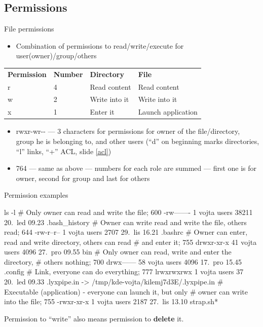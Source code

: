 \documentclass[hyperref={bookmarks=true, unicode=true, colorlinks=true, pdftitle={Linux, command line and MetaCentrum}, plainpages=false, pdfauthor={Vojtech Zeisek}, pdfsubject={Course about use of Linux command line, writing shell scripts and using MetaCentrum of CESNET}, pdfcreator={XeLaTeX, http://www.xelatex.org/}, pdfkeywords={Linux, GNU, BASH, shell, command line, MetaCentrum}, linkcolor=Sienna, anchorcolor=black, citecolor=green, filecolor=magenta, menucolor=Sienna, urlcolor=cyan, pdftex}, compress, ucs, xelatex, xcolor=svgnames, 11pt]{beamer}
\begin{document}
\subsection{Permissions}

\begin{frame}{File permissions}
\begin{itemize}
  \item Combination of permissions to read/write/execute for user(owner)/group/others
\end{itemize}
\begin{center}
\begin{tabular}{llll}
\textbf{Permission} & \textbf{Number} & \textbf{Directory} & \textbf{File}\\
r & 4 & Read content & Read content\\
w & 2 & Write into it & Write into it\\
x & 1 & Enter it & Launch application \\
\end{tabular}
\end{center}
\begin{itemize}
  \item rwxr-wr{-}- --- 3 characters for permissions for owner of the file/directory, group he is belonging to, and other users (``d'' on beginning marks directories, ``l'' links, ``+'' ACL, slide \ref{acl})
  \item 764 --- same as above --- numbers for each role are summed --- first one is for owner, second for group and last for others
\end{itemize}
\end{frame}

\begin{frame}[fragile]{Permission examples}
\begin{bashcode}
    ls -l
    # Only owner can read and write the file; 600
    -rw-------   1 vojta users   38211 20. led 09.23 .bash_history
    # Owner can write read and write the file, others read; 644
    -rw-r--r--   1 vojta users    2707 29. lis 16.21 .bashrc
    # Owner can enter, read and write directory, others can read
    # and enter it; 755
    drwxr-xr-x  41 vojta users    4096 27. pro 09.55 bin
    # Only owner can read, write and enter the directory,
    # others nothing; 700
    drwx------  58 vojta users    4096 17. pro 15.45 .config
    # Link, everyone can do everything; 777
    lrwxrwxrwx   1 vojta users      37 20. led 09.33 .lyxpipe.in ->
      /tmp/kde-vojta/kilemj7d3E/.lyxpipe.in
    # Executable (application) - everyone can launch it, but only
    # owner can write into the file; 755
    -rwxr-xr-x   1 vojta users    2187 27. lis 13.10 strap.sh*
\end{bashcode}
\vfil
Permission to ``write'' also means permission to \textbf{delete} it.
\end{frame}
\end{document}
